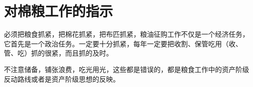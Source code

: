 \section[对棉粮工作的指示（一九六七年五月一日）]{对棉粮工作的指示}


必须把粮食抓紧，把棉花抓紧，把布匹抓紧，粮油征购工作不仅是一个经济任务，它首先是一个政治任务。一定要十分抓紧，每年一定要把收割、保管吃用（收、管、吃）抓的很紧，而且抓的及时。

不注意储备，铺张浪费，吃光用光，这些都是错误的，都是粮食工作中的资产阶级反动路线或者是资产阶级思想的反映。

